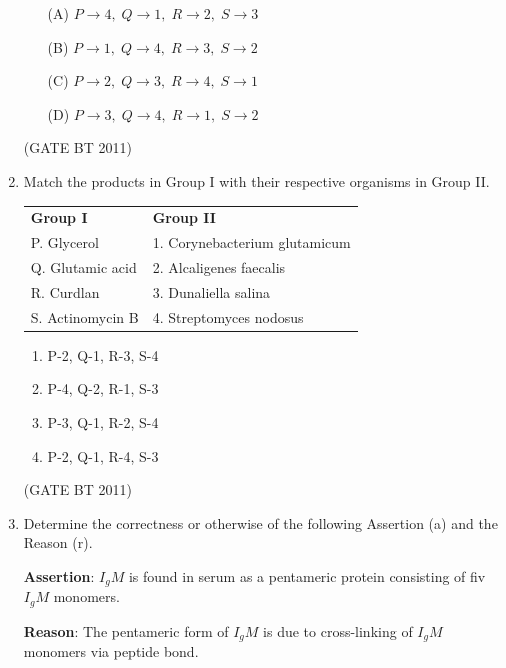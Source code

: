 \documentclass[journal,12pt,onecolumn]{IEEEtran}
\begin{document}
\begin{enumerate}
  \begin{multicols}{2}
  \begin{enumerate}
    \item[(A)] $P \to 4,\; Q \to 1,\; R \to 2,\; S \to 3$
    \item[(B)] $P \to 1,\; Q \to 4,\; R \to 3,\; S \to 2$
    \item[(C)] $P \to 2,\; Q \to 3,\; R \to 4,\; S \to 1$
    \item[(D)] $P \to 3,\; Q \to 4,\; R \to 1,\; S \to 2$
  \end{enumerate}
  \end{multicols}
  \hfill(GATE BT 2011)
  
\item Match the products in Group I with their respective organisms in Group II.  

\begin{table}[H]
  \begin{tabular}{p{4cm} p{6cm}}
    \textbf{Group I}    & \textbf{Group II} \\
    P. Glycerol         & 1. Corynebacterium glutamicum \\
    Q. Glutamic acid    & 2. Alcaligenes faecalis \\
    R. Curdlan          & 3. Dunaliella salina \\
    S. Actinomycin B    & 4. Streptomyces nodosus \\
  \end{tabular}
  \end{table}
  
  \begin{multicols}{2}
  \begin{enumerate}
    \item P-2, Q-1, R-3, S-4  
    \item P-4, Q-2, R-1, S-3  
    \item P-3, Q-1, R-2, S-4  
    \item P-2, Q-1, R-4, S-3  
  \end{enumerate}
  \end{multicols} \hfill(GATE BT 2011)

\item Determine the correctness or otherwise of the following Assertion (a) and the Reason (r).  

\textbf{Assertion}: $I_gM$ is found in serum as a pentameric protein consisting of fiv $I_gM$ monomers.  

\textbf{Reason}: The pentameric form of $I_gM$ is due to cross-linking of $I_gM$ monomers via peptide bond.  


\end{enumerate}
\end{document}
